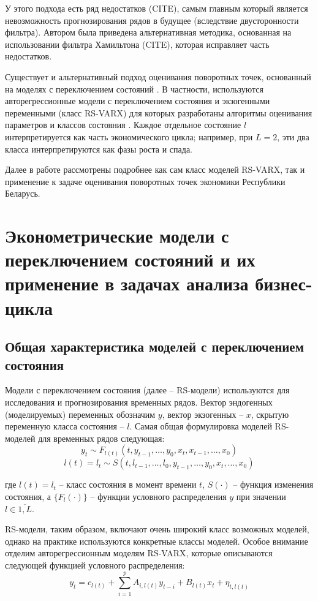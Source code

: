 \documentclass[a4paper,14pt]{extreport}
\begin{document}
У этого подхода есть ряд недостатков (CITE), самым главным который является невозможность прогнозирования рядов в будущее (вследствие двусторонности фильтра). Автором была приведена альтернативная методика, основанная на использовании фильтра Хамильтона (CITE), которая исправляет часть недостатков.

Существует и альтернативный подход оценивания поворотных точек, основанный на моделях с переключением состояний \cite{hamNewApproach}. В частности, используются авторегрессионные модели с переключением состояния и экзогенными переменными (класс RS-VARX) для которых разработаны алгоритмы оценивания параметров и классов состояния \cite{malNovopMSVARX}. Каждое отдельное состояние $l$ интерпретируется как часть экономического цикла; например, при $L=2$, эти два класса интерпретируются как фазы роста и спада. 

Далее в работе рассмотрены подробнее как сам класс моделей RS-VARX, так и применение к задаче оценивания поворотных точек экономики Республики Беларусь. 


\chapter{Эконометрические модели с переключением состояний и их применение в задачах анализа бизнес-цикла}

\section{Общая характеристика моделей с переключением состояния}

Модели с переключением состояния (далее – RS-модели) используются для исследования и прогнозирования временных рядов. Вектор эндогенных (моделируемых) переменных обозначим $y$, вектор экзогенных -- $x$, скрытую переменную класса состояния -- $l$.
Самая общая формулировка моделей RS-моделей для временных рядов следующая:
\[
	y_t \sim F_{l(t)}(t, y_{t-1}, \dots, y_0, x_t, x_{t-1}, \dots, x_0) 
\]
\[
	l(t) = l_t \sim S(t, l_{t-1}, \dots, l_0, y_{t-1}, \dots, y_0, x_t, \dots, x_0) 
\]

где $l(t) = l_t$ -- класс состояния в момент времени $t$, $S(\cdot)$ -- функция изменения состояния, а $\{F_l(\cdot)\}$ -- функции условного распределения $y$ при значении $l \in \overline{1,L}$. 

RS-модели, таким образом, включают очень широкий класс возможных моделей, однако на практике используются конкретные классы моделей. Особое внимание отделим авторегрессионным моделям RS-VARX, которые описываются следующей функцией условного распределения:
\[
	y_{t}=c_{l(t)} + \sum_{i=1}^{p} A_{i,l(t)} y_{t-i} + B_{l(t)} x_{t} + \eta_{t, l(t)}
\]
\end{document}
